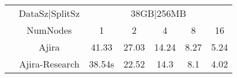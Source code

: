\begin{tabularx}{\linewidth}{*{7}{c|}}
\cline{2-7}
& DataSz|SplitSz
& \multicolumn{5}{c|}{38GB|256MB} \\
\cline{2-7}
& NumNodes
& 1 & 2 & 4 & 8 & 16 \\
\cline{2-7}
& Ajira
& 41.33 & 27.03 & 14.24 & 8.27 & 5.24 \\
\cline{2-7}
& Ajira-Research
& 38.54s & 22.52 & 14.3 & 8.1 & 4.02 \\
\cline{2-7}
\end{tabularx}
